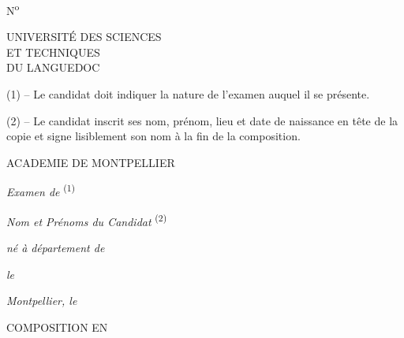 
N\textsuperscript{o}

UNIVERSITÉ DES SCIENCES\\
ET TECHNIQUES\\
DU LANGUEDOC

(1) -- Le candidat doit indiquer la nature de l'examen auquel il se présente.

(2) -- Le candidat inscrit ses nom, prénom, lieu et date de naissance en tête de la copie et signe lisiblement son nom à la fin de la composition.

ACADEMIE DE MONTPELLIER

\textit{Examen de} \textsuperscript{(1)} \dotfill\\
\mbox{}\dotfill

\textit{Nom et Prénoms du Candidat} \textsuperscript{(2)} \dotfill

\textit{né à} \dotfill\quad \textit{département de} \dotfill

\textit{le} \dotfill{}

\textit{Montpellier, le} \dotfill{}

COMPOSITION EN \dotfill
